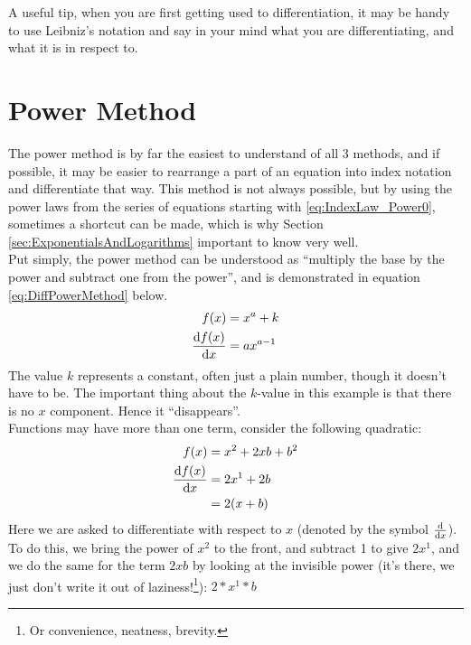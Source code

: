 A useful tip, when you are first getting used to differentiation, it may be
handy to use Leibniz's notation and say in your mind what you are
differentiating, and what it is in respect to.
\section{Power Method}
\label{sec:PowerMethod}
The power method is by far the easiest to understand of all 3 methods, and if
possible, it may be easier to rearrange a part of an equation into index
notation and differentiate that way. This method is not always possible,
but by using the power laws from the series of equations starting with
\ref{eq:IndexLaw_Power0}, sometimes a shortcut can be made, which is why
Section \ref{sec:ExponentialsAndLogarithms} important to know very well.
\\
Put simply, the power method can be understood as ``multiply the base by the
power and subtract one from the power'', and is demonstrated in equation
\ref{eq:DiffPowerMethod} below.
\begin{align}
             f(x) & = {x}^{a} + k \label{eq:DiffPowerMethodKValue} \\
  \frac{\mathrm{d}f(x)}{\mathrm{d}x} & = a{x}^{a-1} \label{eq:DiffPowerMethod}
\end{align}
The value $k$ represents a constant, often just a plain number, though it
doesn't have to be. The important thing about the $k$-value in this example is
that there is no $x$ component. Hence it ``disappears''.\\
Functions may have more than one term, consider the following quadratic:
\begin{align}
  f(x)             & = {x}^{2} + 2xb + {b}^{2} \\
  \frac{\mathrm{d}f(x)}{\mathrm{d}x} & = 2{x}^{1} + 2b \\
                   & = 2(x+b) \label{eq:DiffPowerMethodRespectTo}
\end{align}
Here we are asked to differentiate with respect to $x$ (denoted by the symbol
$\frac{\mathrm{d}}{\mathrm{d}x}$). To do this, we bring the power of ${x}^{2}$ to the front, and
subtract 1 to give $2{x}^{1}$, and we do the same for the term ${2xb}$ by
looking at the invisible power (it's there, we just don't write it out of
laziness!\footnote{Or convenience, neatness, brevity.}): $2*{x}^{1}*b$
